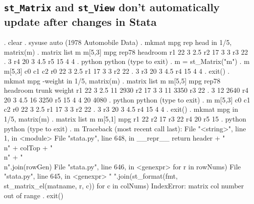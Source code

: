 \documentclass{article}
\begin{document}
\subsection{\lstinline$st_Matrix$ and \lstinline$st_View$ don't automatically update after changes in Stata}

\begin{stlog}
{\smallskip}
. clear
{\smallskip}
. sysuse auto
(1978 Automobile Data)
{\smallskip}
. mkmat mpg rep head in 1/5, matrix(m)
{\smallskip}
. matrix list m
{\smallskip}
m[5,3]
         mpg     rep78  headroom
r1        22         3       2.5
r2        17         3         3
r3        22         .         3
r4        20         3       4.5
r5        15         4         4
{\smallskip}
. python
 python (type {} to exit) 
. m = st_Matrix("m")
{\smallskip}
. m
{\smallskip}
m[5,3]
           c0         c1         c2
r0         22          3        2.5
r1         17          3          3
r2         22          .          3
r3         20          3        4.5
r4         15          4          4
{\smallskip}
. exit()
{\smallskip}
. mkmat mpg -weight in 1/5, matrix(m)
{\smallskip}
. matrix list m
{\smallskip}
m[5,5]
         mpg     rep78  headroom     trunk    weight
r1        22         3       2.5        11      2930
r2        17         3         3        11      3350
r3        22         .         3        12      2640
r4        20         3       4.5        16      3250
r5        15         4         4        20      4080
{\smallskip}
. python
 python (type {} to exit) 
. m
{\smallskip}
m[5,3]
           c0         c1         c2
r0         22          3        2.5
r1         17          3          3
r2         22          .          3
r3         20          3        4.5
r4         15          4          4
{\smallskip}
. exit()
{\smallskip}
. mkmat mpg in 1/5, matrix(m)
{\smallskip}
. matrix list m
{\smallskip}
m[5,1]
    mpg
r1   22
r2   17
r3   22
r4   20
r5   15
{\smallskip}
. python
 python (type {} to exit) 
. m
{\color{red}Traceback (most recent call last):
  File "<string>", line 1, in <module>
  File "stata.py", line 648, in __repr__
    return header + "\\n" + colTop + "\\n" + "\\n".join(rowGen)
  File "stata.py", line 646, in <genexpr>
    for r in rowNums)
  File "stata.py", line 645, in <genexpr>
    " ".join(st_format(fmt, st_matrix_el(matname, r, c)) for c in colNums)
IndexError: matrix col number out of range}
{\smallskip}
. exit()
\end{stlog}
\end{document}
